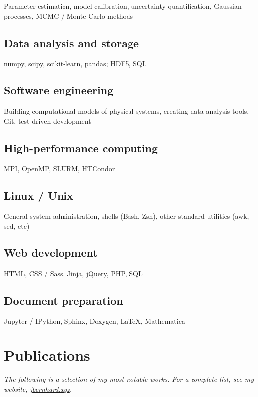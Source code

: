 \documentclass[letterpaper,10pt]{article}
\begin{document}
\begin{multicols}{2}
Parameter estimation, model calibration, uncertainty quantification, Gaussian processes, MCMC / Monte Carlo methods

\subsection{Data analysis and storage}

numpy, scipy, scikit-learn, pandas;
HDF5, SQL

\subsection{Software engineering}

Building computational models of physical systems, creating data analysis tools, Git, test-driven development

\subsection{High-performance computing}

MPI, OpenMP, SLURM, HTCondor

\subsection{Linux / Unix}

General system administration, shells (Bash, Zsh), other standard utilities (awk, sed, etc)

\subsection{Web development}

HTML, CSS / Sass, Jinja, jQuery, PHP, SQL

\subsection{Document preparation}

Jupyter / IPython, Sphinx, Doxygen, \LaTeX, Mathematica



\section{Publications}

\emph{%
  The following is a selection of my most notable works.
  For a complete list, see my website, \href{https://jbernhard.xyz}{jbernhard.xyz}.
}


\end{multicols}
\end{document}
